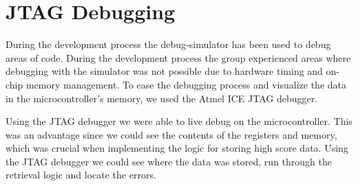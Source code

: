 \section{JTAG Debugging}
	During the development process the debug-simulator has been used to debug areas of code. During the development process the group experienced areas where debugging with the simulator was not possible due to hardware timing and on-chip memory management. To ease the debugging process and visualize the data in the microcontroller's memory, we used the Atmel ICE JTAG debugger. 
	
	Using the JTAG debugger we were able to live debug on the microcontroller. This was an advantage since we could see the contents of the registers and memory, which was crucial when implementing the logic for storing high score data. Using the JTAG debugger we could see where the data was stored, run through the retrieval logic and locate the errors. 
	